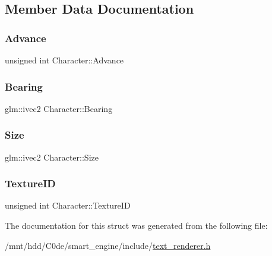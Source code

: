 \subsection{Member Data Documentation}
\mbox{\label{structCharacter_a5338c0800545802a63f8e4945573cbe7}} 
\subsubsection{\texorpdfstring{Advance}{Advance}}
{\footnotesize\ttfamily unsigned int Character\+::\+Advance}

\mbox{\label{structCharacter_afef98bf9c7f5313d96476f6f3f85f872}} 
\subsubsection{\texorpdfstring{Bearing}{Bearing}}
{\footnotesize\ttfamily glm\+::ivec2 Character\+::\+Bearing}

\mbox{\label{structCharacter_aaaa598050e0ef590fe6903fd2bab40b8}} 
\subsubsection{\texorpdfstring{Size}{Size}}
{\footnotesize\ttfamily glm\+::ivec2 Character\+::\+Size}

\mbox{\label{structCharacter_a411760a6a33f2cb54dd6a0138e038a46}} 
\subsubsection{\texorpdfstring{Texture\+ID}{TextureID}}
{\footnotesize\ttfamily unsigned int Character\+::\+Texture\+ID}



The documentation for this struct was generated from the following file\+:\begin{DoxyCompactItemize}
\item 
/mnt/hdd/\+C0de/smart\+\_\+engine/include/\hyperlink{text__renderer_8h}{text\+\_\+renderer.\+h}\end{DoxyCompactItemize}
